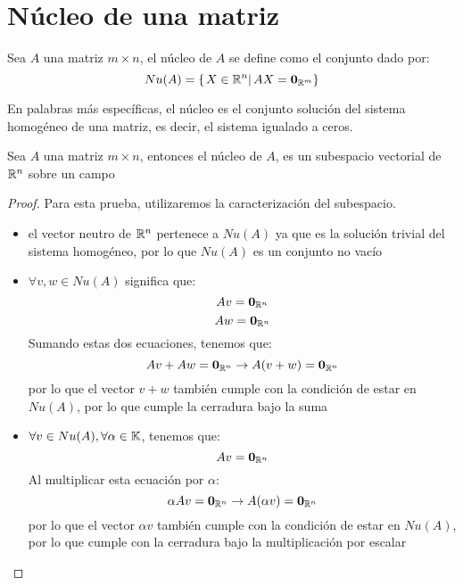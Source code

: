 \newpage
\section{Núcleo de una matriz}
\begin{dfn}
Sea $A$ una matriz $m\times n$, el núcleo de $A$ se define como el conjunto dado por:
~\\
\[Nu(A)=\left\{ \left. X \in \mathbb{R}^n \right| AX=\mathbf{0}_{\mathbb{R}^m} \right\}\]
\end{dfn}
En palabras más específicas, el núcleo es el conjunto solución del sistema homogéneo de una matriz, es decir, el sistema igualado a ceros.
~\\
\begin{theorem}
Sea $A$ una matriz $m \times n$, entonces el núcleo de $A$, es un subespacio vectorial de $\mathbb{R}^n$ sobre un campo \dobleK
\end{theorem}
\begin{proof}
    Para esta prueba, utilizaremos la caracterización del subespacio.
    \begin{itemize}
        \item el vector neutro de $\mathbb{R}^n$ pertenece a $Nu(A)$ ya que es la solución trivial del sistema homogéneo, por lo que $Nu(A)$ es un conjunto no vacío
        \item $\forall v,w \in Nu(A)$ significa que:
        $$Av = \mathbf{0}_{\mathbb{R}^n}$$
        $$Aw = \mathbf{0}_{\mathbb{R}^n}$$
        Sumando estas dos ecuaciones, tenemos que:
        $$Av + Aw = \mathbf{0}_{\mathbb{R}^n} \rightarrow A(v+w) = \mathbf{0}_{\mathbb{R}^n}$$
        por lo que el vector $v+w$ también cumple con la condición de estar en $Nu(A)$, por lo que cumple la cerradura bajo la suma
        \item $\forall v \in Nu(A), \forall \alpha \in \mathbb{K}$, tenemos que:
        $$Av = \mathbf{0}_{\mathbb{R}^n}$$
        Al multiplicar esta ecuación por $\alpha$:
        $$\alpha Av = \mathbf{0}_{\mathbb{R}^n} \rightarrow A(\alpha v) = \mathbf{0}_{\mathbb{R}^n}$$
        por lo que el vector $\alpha v$ también cumple con la condición de estar en $Nu(A)$, por lo que cumple con la cerradura bajo la multiplicación por escalar
    \end{itemize}
\end{proof}

